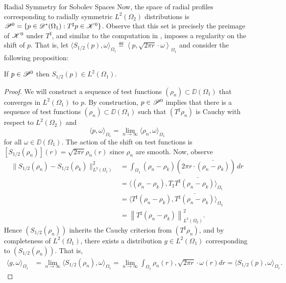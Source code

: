 \begin{chapter}{Radial Symmetry for Sobolev Spaces}
Now, the space of radial profiles corresponding to radially symmetric $L^2(\Omega_2)$ distributions is $\mathscr P^0 = \{p \in \mathscr D^*(\Omega_1): T^\sharp p \in \mathscr K^0\}$.
Observe that this set is precisely the preimage of $\mathscr K^0$ under $T^\sharp$, and similar to the computation in , imposes a regularity on the shift of $p$.
That is, let $\langle S_{1/2}(p),\omega\rangle_{\Omega_1} \eqdef \left\langle p, \sqrt{2\pi r}\cdot \omega\right\rangle_{\Omega_1}$ and consider the following proposition:
\begin{prop} \label{prop:radialL2}
  If $p \in \mathscr P^0$ then $S_{1/2}(p) \in L^2(\Omega_1)$.
\end{prop}
\begin{proof}
  We will construct a sequence of test functions $(\rho_n) \subset \DD(\Omega_1)$ that converges in $L^2(\Omega_1)$ to $p$.
By construction, $p\in \mathscr P^0$ implies that there is a sequence of test functions $(\rho_n)\subset \DD(\Omega_1)$ such that $(T^\sharp \rho_n)$ is Cauchy with respect to $L^2(\Omega_2)$ and
\begin{equation}
  \langle p,\omega\rangle_{\Omega_1} = \lim_{n\to\infty}\langle \rho_n, \omega\rangle_{\Omega_1}
\end{equation}
for all $\omega\in \DD(\Omega_1)$.
The action of the shift on test functions is $[S_{1/2}(\rho_n)](r) = \sqrt{2\pi r}\rho_n(r)$ since $\rho_n$ are smooth.
Now, observe
\begin{align}
  \|S_{1/2}(\rho_n) - S_{1/2}(\rho_k)\|_{L^2(\Omega_1)}^2 
  &= \int_{\Omega_1} (\rho_n - \rho_k)\left(2\pi r\cdot \bar{(\rho_n - \rho_k)}\right) \,dr \nonumber\\
  &= \Big\langle (\rho_n - \rho_k),T_\sharp T^\sharp\bar{(\rho_n - \rho_k)} \Big\rangle_{\Omega_1} \nonumber\\
  &= \Big\langle T^\sharp (\rho_n - \rho_k),\bar{T^\sharp(\rho_n - \rho_k)} \Big\rangle_{\Omega_2} \nonumber\\
  &= \left\| T^\sharp (\rho_n - \rho_k)\right\|_{L^2(\Omega_2)}^2. \label{eq:isometry}
\end{align}
Hence $\left(S_{1/2}(\rho_n)\right)$ inherits the Cauchy criterion from $(T^\sharp\rho_n)$, and by completeness of $L^2(\Omega_1)$, there exists a distribution $g \in L^2(\Omega_1)$ corresponding to $\left(S_{1/2}(\rho_n)\right)$. 
That is,
\begin{align}
  \Big\langle g,\omega\Big\rangle_{\Omega_1} 
    &= \lim_{n\to \infty} \Big\langle S_{1/2}(\rho_n),\omega\Big\rangle_{\Omega_1} = \lim_{n\to \infty} \int_{\Omega_1} \rho_n(r),\sqrt{2\pi r}\cdot \omega(r)dr = \Big\langle S_{1/2}(p),\omega\Big\rangle_{\Omega_1}.

\end{align}
\end{proof}
\end{chapter}
